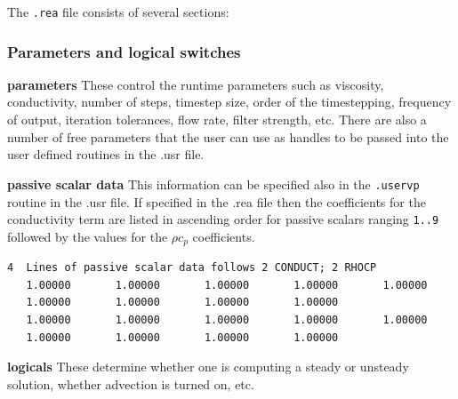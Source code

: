 
The {\tt .rea} file consists of several sections:
\subsubsection*{ Parameters and logical switches}
\begin{description}
\item{\bf parameters} These control the runtime parameters such as viscosity,
    conductivity, number of steps, timestep size, order of the timestepping,
    frequency of output, iteration tolerances, flow rate, filter strength,
    etc.   There are also a number of free parameters that the user can
    use as handles to be passed into the user defined routines in the .usr file.
\item{\bf passive scalar data} This information can be specified also in the \texttt{.uservp} routine in the .usr file. If specified in the .rea file then the coefficients for the conductivity term are listed in ascending order for passive scalars ranging \texttt{1..9} followed by the values for the \(\rho c_p\) coefficients.
\begin{verbatim}
4  Lines of passive scalar data follows 2 CONDUCT; 2 RHOCP
   1.00000       1.00000       1.00000       1.00000       1.00000
   1.00000       1.00000       1.00000       1.00000
   1.00000       1.00000       1.00000       1.00000       1.00000
   1.00000       1.00000       1.00000       1.00000
\end{verbatim}
\item{\bf logicals} These determine whether one is computing a steady or unsteady
  solution, whether advection is turned on, etc.
\end{description}

